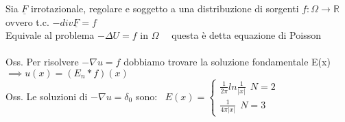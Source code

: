 \documentclass{article}
\theoremstyle{unnumbered}
\theoremstyle{unnumbered1}
\begin{document}
Sia $\underline{F}$ irrotazionale, regolare e soggetto a una distribuzione di sorgenti $f:\Omega\to\mathbb{R}$ ovvero t.c. $-div\underline{F}=f$\\
Equivale al problema $-\Delta U=f$ in $\Omega$ \ \ questa è detta equazione di Poisson\\ \\
%
%
Oss. Per risolvere $-\nabla u = f$ dobbiamo trovare la soluzione fondamentale E(x) $\implies u(x)=(E_n * f)(x)$\\
%
Oss. Le soluzioni di $-\nabla u =\delta_0$ sono: \ $E(x)=\begin{cases}
\frac{1}{2\pi}ln\frac{1}{|x|} \ \ N=2 \\ \frac{1}{4\pi |x|} \ \ N=3
\end{cases}$ \\ \\
\end{document}
